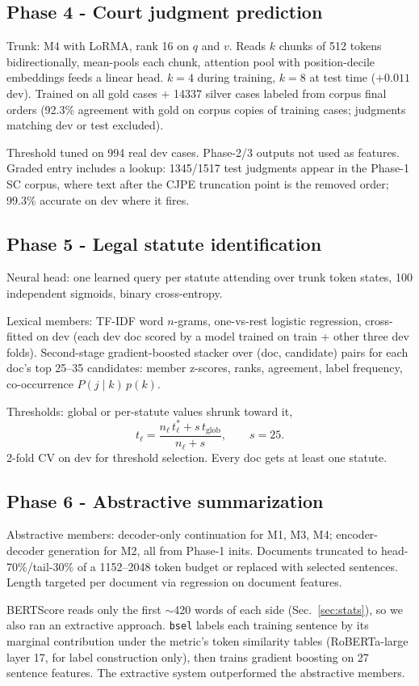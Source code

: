 \documentclass[11pt, oneside]{article}
\begin{document}
\subsection{Phase 4 - Court judgment prediction}
Trunk: M4 with LoRMA, rank 16 on $q$ and $v$. Reads $k$ chunks of 512 tokens bidirectionally,
mean-pools each chunk, attention pool with position-decile embeddings feeds a linear head. $k=4$ during
training, $k=8$ at test time ($+0.011$ dev). Trained on all gold cases + 14337 silver cases labeled from
corpus final orders (92.3\% agreement with gold on corpus copies of training cases; judgments matching
dev or test excluded).

Threshold tuned on 994 real dev cases. Phase-2/3 outputs not used as features. Graded entry includes a
lookup: 1345/1517 test judgments appear in the Phase-1 SC corpus, where text after the CJPE truncation
point is the removed order; 99.3\% accurate on dev where it fires.

\subsection{Phase 5 - Legal statute identification}
Neural head: one learned query per statute attending over trunk token states, 100 independent sigmoids,
binary cross-entropy.

Lexical members: TF-IDF word $n$-grams, one-vs-rest logistic regression, cross-fitted on dev (each dev
doc scored by a model trained on train + other three dev folds). Second-stage gradient-boosted stacker
over (doc, candidate) pairs for each doc's top 25--35 candidates: member z-scores, ranks, agreement,
label frequency, co-occurrence $P(j\mid k)\,p(k)$.

Thresholds: global or per-statute values shrunk toward it,
\[
t_\ell = \frac{n_\ell\, t_\ell^{*} + s\, t_{\text{glob}}}{n_\ell + s}, \qquad s = 25.
\]
2-fold CV on dev for threshold selection. Every doc gets at least one statute.

\subsection{Phase 6 - Abstractive summarization}
Abstractive members: decoder-only continuation for M1, M3, M4; encoder-decoder generation for M2, all
from Phase-1 inits. Documents truncated to head-70\%/tail-30\% of a 1152--2048 token budget or replaced
with selected sentences. Length targeted per document via regression on document features.

BERTScore reads only the first $\sim$420 words of each side (Sec.~\ref{sec:stats}), so we also ran an
extractive approach. \texttt{bsel} labels each training sentence by its marginal contribution under the
metric's token similarity tables (RoBERTa-large layer 17, for label construction only), then trains
gradient boosting on 27 sentence features. The extractive system outperformed the abstractive members.
\end{document}
